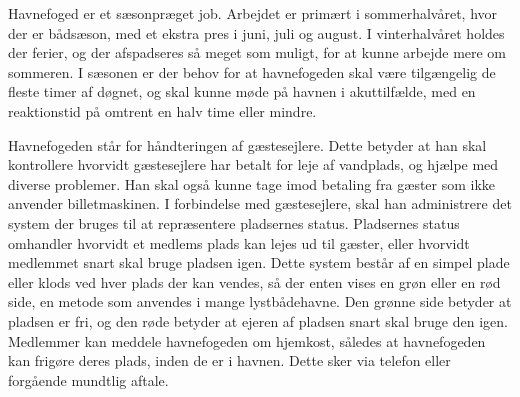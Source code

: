 Havnefoged er et sæsonpræget job. Arbejdet er primært i sommerhalvåret, hvor der er bådsæson, med et ekstra pres i juni, juli og august. I vinterhalvåret holdes der ferier, og der afspadseres så meget som muligt, for at kunne arbejde mere om sommeren. I sæsonen er der behov for at havnefogeden skal være tilgængelig de fleste timer af døgnet, og skal kunne møde på havnen i akuttilfælde, med en reaktionstid på omtrent en halv time eller mindre.

Havnefogeden står for håndteringen af gæstesejlere. Dette betyder at han skal kontrollere hvorvidt gæstesejlere har betalt for leje af vandplads, og hjælpe med diverse problemer. Han skal også kunne tage imod betaling fra gæster som ikke anvender billetmaskinen. I forbindelse med gæstesejlere, skal han administrere det system der bruges til at repræsentere pladsernes status. Pladsernes status omhandler hvorvidt et medlems plads kan lejes ud til gæster, eller hvorvidt medlemmet snart skal bruge pladsen igen. Dette system består af en simpel plade eller klods ved hver plads der kan vendes, så der enten vises en grøn eller en rød side, en metode som anvendes i mange lystbådehavne. Den grønne side betyder at pladsen er fri, og den røde betyder at ejeren af pladsen snart skal bruge den igen. Medlemmer kan meddele havnefogeden om hjemkost, således at havnefogeden kan frigøre deres plads, inden de er i havnen. Dette sker via telefon eller forgående mundtlig aftale.


